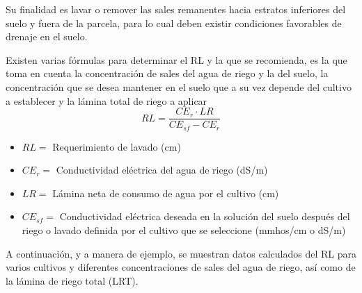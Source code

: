 Su finalidad es lavar o remover las sales remanentes hacia estratos inferiores del suelo y fuera de la parcela, para lo cual deben existir condiciones favorables de drenaje en el suelo. 

Existen varias fórmulas para determinar el RL y la que se recomienda, es la que toma en cuenta la concentración de sales del agua de riego y la del suelo, la concentración que se desea mantener en el suelo que a su vez depende del cultivo a establecer y la lámina total de riego a aplicar
\begin{equation}
    RL = \frac{CE_r\cdot LR}{CE_{sf} - CE_r }
\end{equation}
\begin{notation}
\begin{itemize}
    \item $RL=$ Requerimiento de lavado (cm)
    \item $CE_r=$ Conductividad eléctrica del agua de riego (dS/m)
    \item $LR=$ Lámina neta de consumo de agua por el cultivo (cm)
    \item $CE_{sf}=$ Conductividad eléctrica deseada en la solución del suelo después del riego o lavado definida por el cultivo que se seleccione (mmhos/cm o dS/m)
\end{itemize}
\end{notation}
A continuación, y a manera de ejemplo, se muestran datos calculados del RL para varios cultivos y diferentes concentraciones de sales del agua de riego, así como de la lámina de riego total (LRT).
